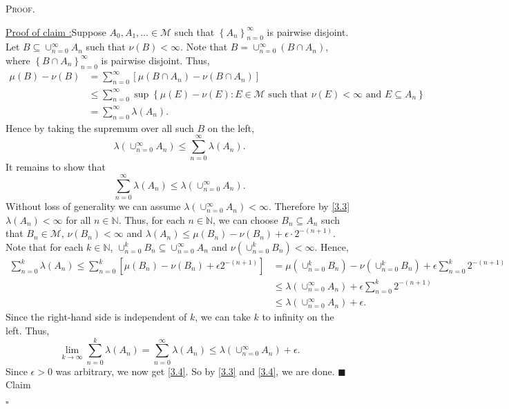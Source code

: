 \documentclass[12pt]{article}
\newcounter{ProofCounter}
\newcounter{ClaimCounter}[ProofCounter]
\newenvironment{Proof}{\stepcounter{ProofCounter}\textsc{Proof.}}{\hfill$\square$}
\newenvironment{claim}[1]{\vspace{1mm}\stepcounter{ClaimCounter}\par\noindent\underline{\bf Claim \theClaimCounter:}\space#1}{}
\newenvironment{claimproof}[1]{\par\noindent\underline{Proof of claim \theClaimCounter:}\space#1}{\hfill $\blacksquare$ Claim \theClaimCounter}
\begin{document}
\begin{Proof}
\begin{claimproof}
Suppose $A_{0}, A_{1}, \hdots \in \mathcal{M}$ such that $\left\{ A_{n} \right\}_{n=0}^{\infty}$ is pairwise disjoint. Let $B \subseteq
\cup_{n=0}^{\infty} A_{n}$ such that $\nu(B) < \infty$. Note that $B = \cup_{n=0}^{\infty}(B\cap A_{n})$, where $\left\{ B\cap A_{n}
\right\}_{n=0}^{\infty}$ is pairwise disjoint. Thus,
\begin{align*}
\mu(B) - \nu(B) & = \sum_{n=0}^{\infty}\left[ \mu(B\cap A_{n}) - \nu(B\cap A_{n}) \right] \\
& \leq \sum_{n=0}^{\infty}\sup\left\{ 
\mu(E) - \nu(E) : E \in \mathcal{M} \text{ such that } \nu(E) < \infty \text{ and } E \subseteq A_{n} \right\} \\
& = \sum_{n=0}^{\infty}\lambda(A_{n}).
\end{align*}
Hence by taking the supremum over all such $B$ on the left,
\begin{equation}
\lambda\left( \cup_{n=0}^{\infty}A_{n} \right) \leq \sum_{n=0}^{\infty}\lambda(A_{n}).
\label{3.3}
\end{equation}
It remains to show that 
\begin{equation}
\sum_{n=0}^{\infty}\lambda(A_{n}) \leq \lambda\left( \cup_{n=0}^{\infty} A_{n} \right).
\label{3.4}
\end{equation}
Without loss of generality we can assume $\lambda\left( \cup_{n=0}^{\infty}A_{n} \right) < \infty$. 
Therefore by \eqref{3.3} $\lambda(A_{n}) < \infty$ for all $n \in \mathbb{N}$. Thus, for each $n \in \mathbb{N}$, we can choose $B_{n}
\subseteq A_{n}$ such that $B_{n} \in \mathcal{M}$, $\nu(B_{n}) < \infty$ and $\lambda(A_{n}) \leq \mu(B_{n}) - \nu(B_{n}) + \epsilon\cdot
2^{-(n+1)}$. Note that for each $k \in \mathbb{N}$, $\cup_{n=0}^{k}B_{n} \subseteq \cup_{n=0}^{\infty}A_{n}$ and $\nu\left( \cup_{n=0}^{k}B_{n}
\right) < \infty$. Hence,
\begin{align*}
\sum_{n=0}^{k}\lambda(A_{n}) \leq \sum_{n=0}^{k}\left[ \mu(B_{n}) - \nu(B_{n}) + \epsilon 2^{-(n+1)}\right] & = \mu\left( \cup_{n=0}^{k}B_{n} \right)
- \nu\left( \cup_{n=0}^{k}B_{n} \right) + \epsilon\sum_{n=0}^{k}2^{-(n+1)} \\
& \leq \lambda\left( \cup_{n=0}^{\infty}A_{n} \right) + \epsilon\sum_{n=0}^{k}2^{-(n+1)} \\
& \leq \lambda\left( \cup_{n=0}^{\infty}A_{n} \right) + \epsilon.
\end{align*}
Since the right-hand side is independent of $k$, we can take $k$ to infinity on the left. Thus,
\[ \lim_{k\rightarrow\infty}\sum_{n=0}^{k}\lambda(A_{n}) = \sum_{n=0}^{\infty}\lambda(A_{n}) \leq \lambda\left( \cup_{n=0}^{\infty}A_{n}
\right) + \epsilon. \]
Since $\epsilon > 0$ was arbitrary, we now get \eqref{3.4}. So by \eqref{3.3} and \eqref{3.4}, we are done.
\end{claimproof}


\end{Proof}
\end{document}
